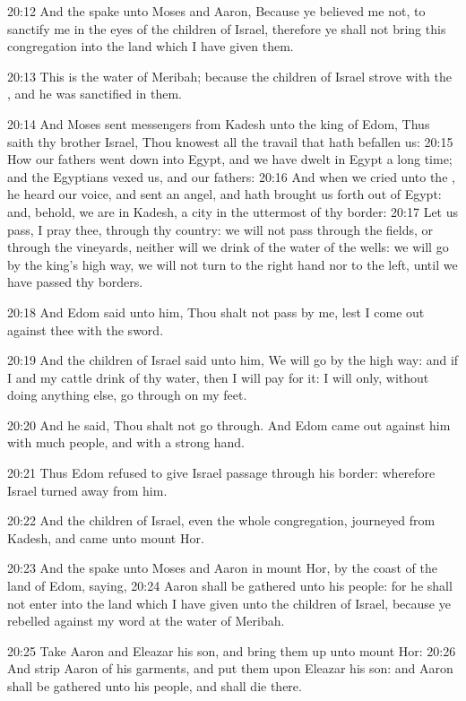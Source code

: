 20:12 And the \LORD spake unto Moses and Aaron, Because ye believed me
not, to sanctify me in the eyes of the children of Israel, therefore
ye shall not bring this congregation into the land which I have given
them.

20:13 This is the water of Meribah; because the children of Israel
strove with the \LORD, and he was sanctified in them.

20:14 And Moses sent messengers from Kadesh unto the king of Edom,
Thus saith thy brother Israel, Thou knowest all the travail that hath
befallen us: 20:15 How our fathers went down into Egypt, and we have
dwelt in Egypt a long time; and the Egyptians vexed us, and our
fathers: 20:16 And when we cried unto the \LORD, he heard our voice,
and sent an angel, and hath brought us forth out of Egypt: and,
behold, we are in Kadesh, a city in the uttermost of thy border: 20:17
Let us pass, I pray thee, through thy country: we will not pass
through the fields, or through the vineyards, neither will we drink of
the water of the wells: we will go by the king's high way, we will not
turn to the right hand nor to the left, until we have passed thy
borders.

20:18 And Edom said unto him, Thou shalt not pass by me, lest I come
out against thee with the sword.

20:19 And the children of Israel said unto him, We will go by the high
way: and if I and my cattle drink of thy water, then I will pay for
it: I will only, without doing anything else, go through on my feet.

20:20 And he said, Thou shalt not go through. And Edom came out
against him with much people, and with a strong hand.

20:21 Thus Edom refused to give Israel passage through his border:
wherefore Israel turned away from him.

20:22 And the children of Israel, even the whole congregation,
journeyed from Kadesh, and came unto mount Hor.

20:23 And the \LORD spake unto Moses and Aaron in mount Hor, by the
coast of the land of Edom, saying, 20:24 Aaron shall be gathered unto
his people: for he shall not enter into the land which I have given
unto the children of Israel, because ye rebelled against my word at
the water of Meribah.

20:25 Take Aaron and Eleazar his son, and bring them up unto mount
Hor: 20:26 And strip Aaron of his garments, and put them upon Eleazar
his son: and Aaron shall be gathered unto his people, and shall die
there.

